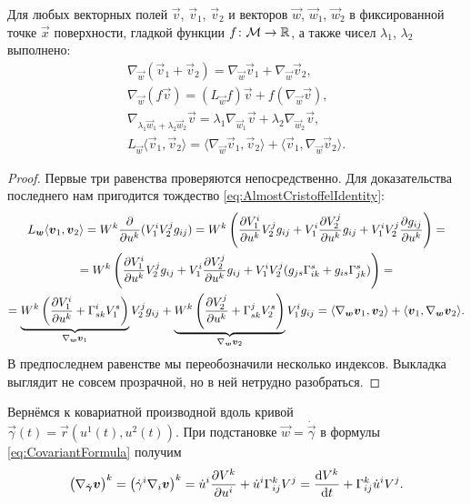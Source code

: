 \begin{proposition} \label{proposition:TranslationProperties}
	Для любых векторных полей $\vec{v}$, $\vec{v}_1$, $\vec{v}_2$ и векторов $\vec{w}$, $\vec{w}_1$, $\vec{w}_2$ в фиксированной точке $\vec{x}$ поверхности, гладкой функции $f\colon \mathcal{M} \to \mathbb{R}$, а также чисел $\lambda_1$, $\lambda_2$ выполнено:
	\begin{gather*}
		\nabla_{\vec{w}}(\vec{v}_1 + \vec{v}_2) = \nabla_{\vec{w}}\vec{v}_1 + \nabla_{\vec{w}}\vec{v}_2,\\
		\nabla_{\vec{w}}(f\vec{v}) = (L_{\vec{w}}f)\vec{v} + f(\nabla_{\vec{w}}\vec{v}),\\
		\nabla_{\lambda_1\vec{w}_1 + \lambda_2\vec{w}_2}\vec{v} = \lambda_1\nabla_{\vec{w}_1}\vec{v} + \lambda_2\nabla_{\vec{w}_2}\vec{v},\\
		L_{\vec{w}}\langle\vec{v}_1, \vec{v}_2\rangle = \langle\nabla_{\vec{w}}\vec{v}_1, \vec{v}_2\rangle + \langle\vec{v}_1, \nabla_{\vec{w}}\vec{v}_2\rangle.
	\end{gather*}
\end{proposition}

\begin{proof}
	Первые три равенства проверяются непосредственно. Для доказательства последнего нам пригодится тождество \eqref{eq:AlmostCristoffelIdentity}:
	\begin{multline*}
		L_{\boldsymbol{w}}\langle\boldsymbol{v}_1, \boldsymbol{v}_2\rangle = W^k\frac{\partial}{\partial u^k}(V_1^iV_2^jg_{ij}) = W^k\left(\frac{\partial V_1^i}{\partial u^k}V_2^jg_{ij} + V_1^i\frac{\partial V_2^j}{\partial u^k}g_{ij} + V_1^iV_2^j\frac{\partial g_{ij}}{\partial u^k}\right) =\\ = W^k\left(\frac{\partial V_1^i}{\partial u^k}V_2^jg_{ij} + V_1^i\frac{\partial V_2^j}{\partial u^k}g_{ij} + V_1^iV_2^j(g_{js}\Gamma_{ik}^s + g_{is}\Gamma_{jk}^s)\right) =\\ = \underbrace{W^k\left(\frac{\partial V_1^i}{\partial u^k} + \Gamma_{sk}^iV_1^s\right)}_{\nabla_{\boldsymbol{w}}\boldsymbol{v}_1}V_2^jg_{ij} + \underbrace{W^k\left(\frac{\partial V_2^j}{\partial u^k} + \Gamma_{sk}^jV_2^s\right)}_{\nabla_{\boldsymbol{w}}\boldsymbol{v}_2}V_1^ig_{ij} = \langle\nabla_{\boldsymbol{w}}\boldsymbol{v}_1, \boldsymbol{v}_2\rangle + \langle\boldsymbol{v}_1, \nabla_{\boldsymbol{w}}\boldsymbol{v}_2\rangle.
	\end{multline*}
	В предпоследнем равенстве мы переобозначили несколько индексов. Выкладка выглядит не совсем прозрачной, но в ней нетрудно разобраться.
\end{proof}

Вернёмся к ковариатной производной вдоль кривой $\vec{\gamma}(t) = \vec{r}(u^1(t), u^2(t))$. При подстановке $\vec{w} = \dot{\vec{\gamma}}$ в формулы \eqref{eq:CovariantFormula} получим
\[
	\big(\nabla_{\dot{\boldsymbol{\gamma}}}\boldsymbol{v}\big)^k = \big(\dot{\gamma}^i\nabla_i\boldsymbol{v}\big)^k = \dot{u}^i\frac{\partial V^k}{\partial u^i} + \dot{u}^i\Gamma_{ij}^kV^j = \frac{\mathop{}\!\mathrm{d} V^k}{\mathop{}\!\mathrm{d} t} + \Gamma_{ij}^k\dot{u}^iV^j.
\]

